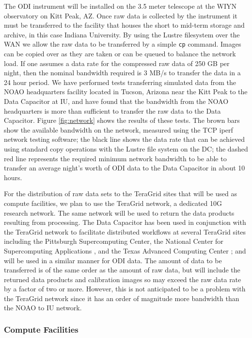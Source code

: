\documentclass[10pt,conference]{IEEEtran}
\begin{document}
The ODI instrument will be installed on the 3.5 meter telescope at the WIYN observatory on Kitt Peak, AZ. Once raw data is collected by the instrument it must be transferred to the facility that houses the short to mid-term storage and archive, in this case Indiana University. By using the Lustre filesystem over the WAN we allow the raw data to be transferred by a simple {\tt cp} command. Images can be copied over as they are taken or can be queued to balance the network load. If one assumes a data rate for the compressed raw data of 250 GB per night, then the nominal bandwidth required is 3 MB/s to transfer the data in a 24 hour period. We have performed tests transferring simulated data from the NOAO headquarters facility located in Tucson, Arizona near the Kitt Peak to the Data Capacitor at IU, and have found that the bandwidth from the NOAO headquarters is more than sufficient to transfer the raw data to the Data Capacitor. Figure \ref{fig:network} shows the results of these tests. The brown bars show the available bandwidth on the network, measured using the TCP iperf network testing software; the black line shows the data rate that can be achieved using standard copy operations with the Lustre file system on the DC; the dashed red line represents the required minimum network bandwidth to be able to transfer an average night's worth of ODI data to
the Data Capacitor in about 10 hours.

For the distribution of raw data sets to the TeraGrid sites that will be used as compute facilities, we plan to use the TeraGrid network, a dedicated 10G research network. The same network will be used to return the data products resulting from processing. The Data Capacitor has been used in conjunction with the TeraGrid network to facilitate distributed workflows at several TeraGrid sites including the Pittsburgh Supercomputing Center, the National Center for Supercomputing Applications \cite{henschel2010}, and the Texas Advanced Computing Center \cite{horowitz2010}; and will be used in a similar manner for ODI data. The amount of data to be transferred is of the same order as the amount of raw data, but will include the returned data products and calibration images so may exceed the raw data rate by a factor of two or more. However, this is not anticipated to be a problem with the TeraGrid network since it has an order of magnitude more bandwidth than the NOAO to IU network.

\subsubsection{Compute Facilities}
\end{document}
